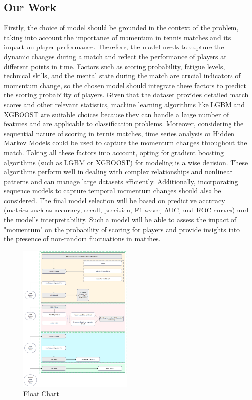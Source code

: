 \documentclass[12pt]{article}
\begin{document}
\subsection{Our Work}
Firstly, the choice of model should be grounded in the context of the problem, taking into account the importance of momentum in tennis matches and its impact on player performance. Therefore, the model needs to capture the dynamic changes during a match and reflect the performance of players at different points in time. Factors such as scoring probability, fatigue levels, technical skills, and the mental state during the match are crucial indicators of momentum change, so the chosen model should integrate these factors to predict the scoring probability of players. Given that the dataset provides detailed match scores and other relevant statistics, machine learning algorithms like LGBM and XGBOOST are suitable choices because they can handle a large number of features and are applicable to classification problems. Moreover, considering the sequential nature of scoring in tennis matches, time series analysis or Hidden Markov Models could be used to capture the momentum changes throughout the match.
Taking all these factors into account, opting for gradient boosting algorithms (such as LGBM or XGBOOST) for modeling is a wise decision. These algorithms perform well in dealing with complex relationships and nonlinear patterns and can manage large datasets efficiently. Additionally, incorporating sequence models to capture temporal momentum changes should also be considered. The final model selection will be based on predictive accuracy (metrics such as accuracy, recall, precision, F1 score, AUC, and ROC curves) and the model's interpretability. Such a model will be able to assess the impact of "momentum" on the probability of scoring for players and provide insights into the presence of non-random fluctuations in matches.
\begin{figure}[H]
      \centering
      \includegraphics[width=0.5\textwidth]{floatChart.png}
      \caption{Float Chart}
\end{figure}
\end{document}
